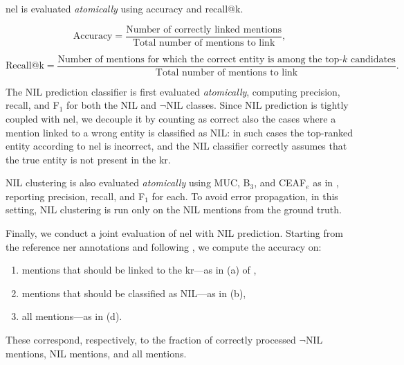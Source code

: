 \ac{nel} is evaluated \textit{atomically} using accuracy and recall@k.  

\begin{equation}
\text{Accuracy} = \frac{\text{Number of correctly linked mentions}}{\text{Total number of mentions to link}},
\end{equation}

\begin{equation}
\text{Recall@k} = \frac{\text{Number of mentions for which the correct entity is among the top-}k\text{ candidates}}{\text{Total number of mentions to link}}.
\end{equation}




The NIL prediction classifier is first evaluated \textit{atomically}, computing precision, recall, and F$_1$ for both the NIL and $\neg$NIL classes. Since NIL prediction is tightly coupled with \ac{nel}, we decouple it by counting as correct also the cases where a mention linked to a wrong entity is classified as NIL: in such cases the top-ranked entity according to \ac{nel} is incorrect, and the NIL classifier correctly assumes that the true entity is not present in the \ac{kr}.

NIL clustering is also evaluated \textit{atomically} using MUC, B$_3$, and CEAF$_e$ as in , reporting precision, recall, and F$_1$ for each. To avoid error propagation, in this setting, NIL clustering is run only on the NIL mentions from the ground truth.

Finally, we conduct a joint evaluation of \ac{nel} with NIL prediction. Starting from the reference \ac{ner} annotations and following , we compute the accuracy on:
\begin{enumerate}
\item mentions that should be linked to the \ac{kr}---as in (a) of ,
\item mentions that should be classified as NIL---as in (b),
\item all mentions---as in (d).
\end{enumerate}
These correspond, respectively, to the fraction of correctly processed $\neg$NIL mentions, NIL mentions, and all mentions.

